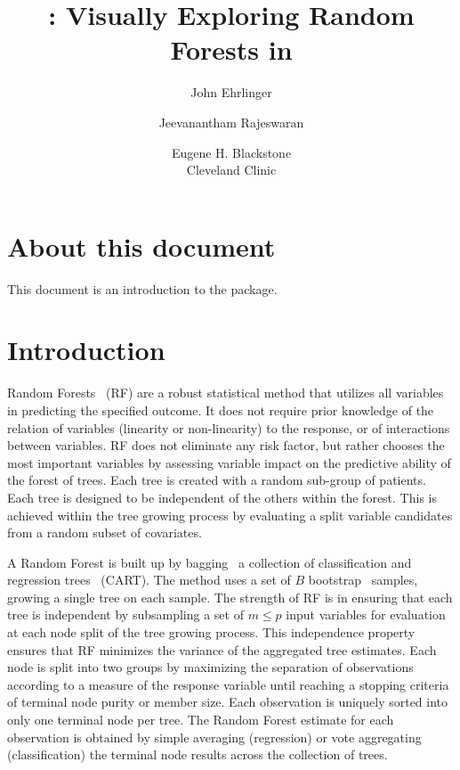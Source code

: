 \documentclass[nojss]{jss}\usepackage[]{graphicx}\usepackage[]{color}
\author{John Ehrlinger \and Jeevanantham Rajeswaran
\and Eugene H. Blackstone\\Cleveland Clinic}
\title{{\pkg{ggRandomForests}}: Visually Exploring Random Forests in \proglang{R}}
\begin{document}



\section{About this document}
This document is an introduction to the   package. 

\section{Introduction} \label{S:introduction}

Random Forests~\citep{Breiman:2001} (RF) are a robust statistical method that utilizes all variables in predicting the specified outcome. It does not require prior knowledge of the relation of variables (linearity or non-linearity) to the response, or of interactions between variables. RF does not eliminate any risk factor, but rather chooses the most important variables by assessing variable impact on the predictive ability of the forest of trees. Each tree is created with a random sub-group of patients. Each tree is designed to be independent of the others within the forest. This is achieved within the tree growing process by evaluating a split variable candidates from a random subset of covariates.

A Random Forest is built up by bagging~\citep{Breiman:1996} a collection of classification and regression trees~\citep{cart:1984} (CART). The method uses a set of $B$ bootstrap~\citep{bootstrap:1994} samples, growing a single tree on each sample. The strength of RF is in ensuring that each tree is independent by subsampling a set of $m \le p$ input variables for evaluation at each node split of the tree growing process. This independence property ensures that RF minimizes the variance of the aggregated tree estimates. Each node is split into two groups by maximizing the separation of observations according to a measure of the response variable until reaching a stopping criteria of terminal node purity or member size. Each observation is uniquely sorted into only one terminal node per tree. The Random Forest estimate for each observation is obtained by simple averaging (regression) or vote aggregating (classification) the terminal node results across the collection of trees. 
\end{document}
